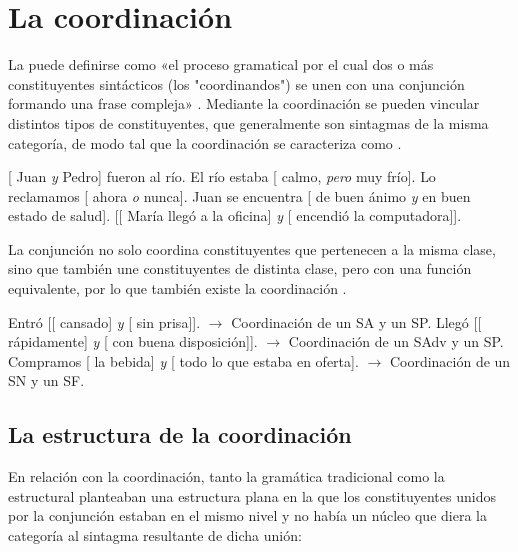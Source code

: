 \section{La coordinación}\label{sec:12-coordinacion}

La  puede definirse como «el proceso gramatical por el cual
dos o más constituyentes sintácticos (los "coordinandos") se unen con una
conjunción formando una frase compleja» \parencite[301]{camacho2016}. Mediante la
coordinación se pueden vincular distintos tipos de constituyentes, que
generalmente son sintagmas de la misma categoría, de modo tal que la
coordinación se caracteriza como .

\begin{exe}
  \ex\label{ex:12-juan-pedro} {}[ Juan \textit{y} Pedro] fueron al río.
  \ex\label{ex:12-rio} El río estaba [ calmo, \textit{pero} muy frío].
  \ex\label{ex:12-ahora} Lo reclamamos [ ahora \textit{o} nunca].
  \ex\label{ex:12-animo} Juan se encuentra [ de buen ánimo \textit{y} en
      buen estado de salud].
  \ex\label{ex:12-maria} {}[[ María llegó a la oficina] \textit{y}
      [ encendió la computadora]].
\end{exe}

La conjunción no solo coordina constituyentes que pertenecen a la misma clase,
sino que también une constituyentes de distinta clase, pero con una función
equivalente, por lo que también existe la coordinación
.

\begin{exe}
  \ex\label{ex:12-cansado} Entró [[ cansado] \textit{y} [ sin
      prisa]]. $\rightarrow$ Coordinación de un SA y un SP.
  \ex\label{ex:12-rapido} Llegó [[ rápidamente] \textit{y} [
      con buena disposición]]. $\rightarrow$ Coordinación de un SAdv y un SP.
  \ex\label{ex:12-bebida} Compramos [ la bebida] \textit{y} [
      todo lo que estaba en oferta]. $\rightarrow$ Coordinación de un SN y un
      SF.
\end{exe}

\subsection{La estructura de la coordinación}\label{sec:12-estructura}

En relación con la coordinación, tanto la gramática tradicional como la
estructural planteaban una estructura plana en la que los constituyentes unidos
por la conjunción estaban en el mismo nivel y no había un núcleo que diera la
categoría al sintagma resultante de dicha unión:

